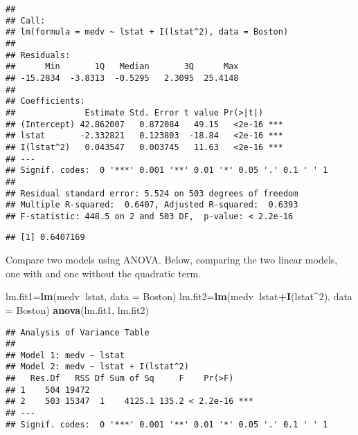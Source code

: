 \documentclass[]{article}
\newenvironment{Shaded}{\begin{snugshade}}{\end{snugshade}}
\newcommand{\KeywordTok}[1]{\textcolor[rgb]{0.13,0.29,0.53}{\textbf{#1}}}
\newcommand{\DataTypeTok}[1]{\textcolor[rgb]{0.13,0.29,0.53}{#1}}
\newcommand{\DecValTok}[1]{\textcolor[rgb]{0.00,0.00,0.81}{#1}}
\newcommand{\OperatorTok}[1]{\textcolor[rgb]{0.81,0.36,0.00}{\textbf{#1}}}
\newcommand{\NormalTok}[1]{#1}
\begin{document}
\begin{verbatim}
## 
## Call:
## lm(formula = medv ~ lstat + I(lstat^2), data = Boston)
## 
## Residuals:
##      Min       1Q   Median       3Q      Max 
## -15.2834  -3.8313  -0.5295   2.3095  25.4148 
## 
## Coefficients:
##              Estimate Std. Error t value Pr(>|t|)    
## (Intercept) 42.862007   0.872084   49.15   <2e-16 ***
## lstat       -2.332821   0.123803  -18.84   <2e-16 ***
## I(lstat^2)   0.043547   0.003745   11.63   <2e-16 ***
## ---
## Signif. codes:  0 '***' 0.001 '**' 0.01 '*' 0.05 '.' 0.1 ' ' 1
## 
## Residual standard error: 5.524 on 503 degrees of freedom
## Multiple R-squared:  0.6407, Adjusted R-squared:  0.6393 
## F-statistic: 448.5 on 2 and 503 DF,  p-value: < 2.2e-16
\end{verbatim}

\begin{Shaded}
\end{Shaded}

\begin{verbatim}
## [1] 0.6407169
\end{verbatim}

Compare two models using ANOVA. Below, comparing the two linear models,
one with and one without the quadratic term.

\begin{Shaded}
\begin{Highlighting}[]
\NormalTok{lm.fit1=}\KeywordTok{lm}\NormalTok{(medv}\OperatorTok{~}\NormalTok{lstat, }\DataTypeTok{data =}\NormalTok{ Boston)}
\NormalTok{lm.fit2=}\KeywordTok{lm}\NormalTok{(medv}\OperatorTok{~}\NormalTok{lstat}\OperatorTok{+}\KeywordTok{I}\NormalTok{(lstat}\OperatorTok{^}\DecValTok{2}\NormalTok{), }\DataTypeTok{data =}\NormalTok{ Boston)}
\KeywordTok{anova}\NormalTok{(lm.fit1, lm.fit2)}
\end{Highlighting}
\end{Shaded}

\begin{verbatim}
## Analysis of Variance Table
## 
## Model 1: medv ~ lstat
## Model 2: medv ~ lstat + I(lstat^2)
##   Res.Df   RSS Df Sum of Sq     F    Pr(>F)    
## 1    504 19472                                 
## 2    503 15347  1    4125.1 135.2 < 2.2e-16 ***
## ---
## Signif. codes:  0 '***' 0.001 '**' 0.01 '*' 0.05 '.' 0.1 ' ' 1
\end{verbatim}
\end{document}
